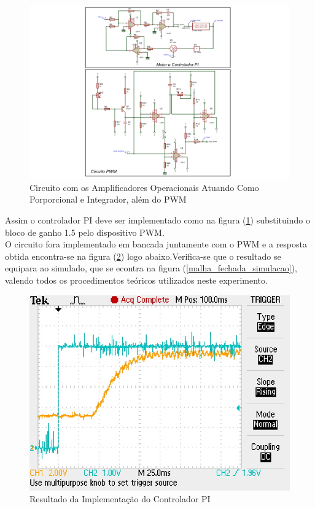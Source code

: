 \documentclass[11pt, a4paper, oneside]{article}
\begin{document}
\begin{figure}[h!]
\centering
\includegraphics[width=.9\linewidth]{amplificador.pdf}
\caption{Circuito com os Amplificadores Operacionais Atuando Como Porporcional e Integrador, além do PWM}	
\label{Amplificador_PI}
\end{figure}

Assim o controlador PI deve ser implementado como na figura (\ref{Amplificador_PI}) substituindo o bloco de ganho 1.5 pelo dispositivo PWM.\\
O circuito fora implementado em bancada juntamente com o PWM e a resposta obtida encontra-se na figura (\ref{Resultado}) logo abaixo.Verifica-se que o resultado se equipara ao simulado, que se econtra na figura (\ref{malha_fechada_simulacao}), valendo todos os procedimentos teóricos utilizados neste experimento.

\begin{figure}[h!]
\centering
\includegraphics[width=.6\linewidth]{Resultado_experimento.jpg}
\caption{Resultado da Implementação do Controlador PI}	
\label{Resultado}
\end{figure}
\end{document}
